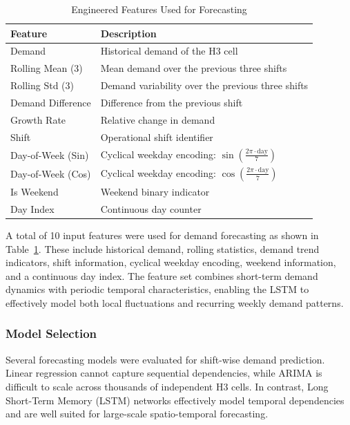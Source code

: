 \documentclass{article}
\begin{document}
\begin{table}[htbp]
\centering
\caption{Engineered Features Used for Forecasting}
\label{tab:engineered_forecasting_features}
\begin{tabularx}{\textwidth}{>{\raggedright\arraybackslash}p{} >{\raggedright\arraybackslash}X}
\hline
\textbf{Feature} & \textbf{Description} \\
\hline
Demand & Historical demand of the H3 cell \\
Rolling Mean (3) & Mean demand over the previous three shifts \\
Rolling Std (3) & Demand variability over the previous three shifts \\
Demand Difference & Difference from the previous shift \\
Growth Rate & Relative change in demand \\
Shift & Operational shift identifier \\
Day-of-Week (Sin) & Cyclical weekday encoding: $\sin\left(\frac{2\pi \cdot \text{day}}{7}\right)$ \\
Day-of-Week (Cos) & Cyclical weekday encoding: $\cos\left(\frac{2\pi \cdot \text{day}}{7}\right)$ \\
Is Weekend & Weekend binary indicator \\
Day Index & Continuous day counter \\
\hline
\end{tabularx}
\end{table}

A total of 10 input features were used for demand forecasting as shown in Table~\ref{tab:engineered_forecasting_features}. These include historical demand, rolling statistics, demand trend indicators, shift information, cyclical weekday encoding, weekend information, and a continuous day index. The feature set combines short-term demand dynamics with periodic temporal characteristics, enabling the LSTM to effectively model both local fluctuations and recurring weekly demand patterns.

\subsubsection{Model Selection}
\label{subsec:model_selection}

Several forecasting models were evaluated for shift-wise demand prediction. Linear regression cannot capture sequential dependencies, while ARIMA is difficult to scale across thousands of independent H3 cells. In contrast, Long Short-Term Memory (LSTM) networks effectively model temporal dependencies and are well suited for large-scale spatio-temporal forecasting.
\end{document}
